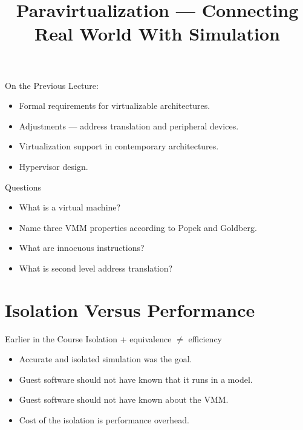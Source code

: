 
\title{Paravirtualization --- Connecting Real World With Simulation}




\startslides

\begin{frame}{On the Previous Lecture:}
  \begin{itemize}
    \item Formal requirements for virtualizable architectures.
    \item Adjustments --- address translation and peripheral devices.
    \item Virtualization support in contemporary architectures.
    \item Hypervisor design.
  \end{itemize}
\end{frame}

\begin{frame}{Questions}
  \begin{itemize}
    \item What is a virtual machine?\pause
    \item Name three VMM properties according to Popek and Goldberg.\pause
    \item What are innocuous instructions?\pause
    \item What is second level address translation?
  \end{itemize}
\end{frame}

\section{Isolation Versus Performance}

\begin{frame}{Earlier in the Course}
  Isolation + equivalence $\neq$ efficiency
  \begin{itemize}
    \item Accurate and isolated simulation was the goal.
    \item Guest software should not have known that it runs in a model.
    \item Guest software should not have known about the VMM.
    \item Cost of the isolation is performance overhead.
  \end{itemize}
\end{frame}

